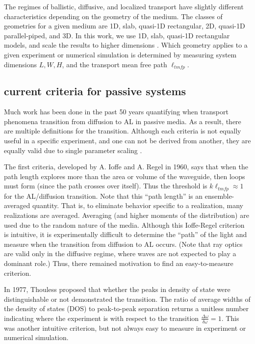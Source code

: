 The regimes of ballistic, diffusive, and localized transport have slightly different characteristics depending on the geometry of the medium. The classes of geometries for a given medium are 1D, slab, quasi-1D rectangular, 2D, quasi-1D parallel-piped, and 3D. In this work, we use 1D, slab, quasi-1D rectangular models, and scale the results to higher dimensions \cite{1979_Anderson}. Which geometry applies to a given experiment or numerical simulation is determined by measuring system dimensions $L,W,H$, and the transport mean free path $\ell_{tmfp}$.


\subsection{current criteria for passive systems}
Much work has been done in the past 50 years quantifying when transport phenomena transition from diffusion to AL in passive media. As a result, there are multiple definitions for the transition. Although each criteria is not equally useful in a specific experiment, and one can not be derived from another, they are equally valid due to single parameter scaling \cite{1979_Anderson}. 

The first criteria, developed by A. Ioffe and A. Regel \cite{1960_Ioffe_criterion} in 1960, says that when the path length explores more than the area or volume of the waveguide, then loops must form (since the path crosses over itself). Thus the threshold is $ k \ell_{tmfp} \approx 1$ for the AL/diffusion transition. Note that this ``path length'' is an ensemble-averaged quantity. That is, to eliminate behavior specific to a realization, many realizations are averaged. Averaging (and higher moments of the distribution) are used due to the random nature of the media. Although this Ioffe-Regel criterion is intuitive, it is experimentally difficult to determine the ``path'' of the light and measure when the transition from diffusion to AL occurs. (Note that ray optics are valid only in the diffusive regime, where waves are not expected to play a dominant role.) Thus, there remained motivation to find an easy-to-measure criterion. 

In 1977, Thouless proposed \cite{1977_Thouless} that whether the peaks in density of state were distinguishable or not demonstrated the transition. The ratio of average widths of the density of states (DOS) to peak-to-peak separation returns a unitless number indicating where the experiment is with respect to the transition $\frac{\Delta \omega}{\delta \omega} =1$. %
This was another intuitive criterion, but not always easy to measure in experiment or numerical simulation. 

